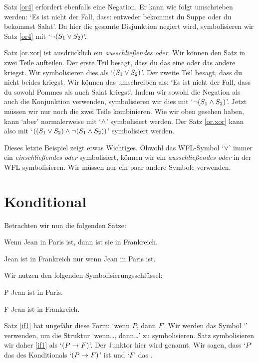 Satz \ref{or4} erfordert ebenfalls eine Negation. Er kann wie folgt umschrieben werden: `Es ist nicht der Fall, dass: entweder bekommst du Suppe oder du bekommst Salat'. Da hier die gesamte Disjunktion negiert wird, symbolisieren wir Satz \ref{or4} mit `$\neg (S_1 \vee S_2)$'.

Satz \ref{or.xor} ist ausdrücklich ein \emph{ausschlie{\ss}endes oder}. Wir können den Satz in zwei Teile aufteilen. Der erste Teil besagt, dass du das eine oder das andere kriegst. Wir symbolisieren dies als `$(S_1 \vee S_2)$'. Der zweite Teil besagt, dass du nicht beides kriegst. Wir können das umschreiben als: `Es ist nicht der Fall, dass du sowohl Pommes als auch Salat kriegst'. Indem wir sowohl die Negation als auch die Konjunktion verwenden, symbolisieren wir dies mit `$\neg (S_1 \wedge S_2)$'. Jetzt müssen wir nur noch die zwei Teile kombinieren. Wie wir oben gesehen haben, kann `aber' normalerweise mit `$\wedge$' symbolisiert werden. Der Satz \ref{or.xor} kann also mit `$((S_1 \vee S_2) \wedge \neg(S_1 \wedge S_2))$' symbolisiert werden.

Dieses letzte Beispiel zeigt etwas Wichtiges. Obwohl das WFL-Symbol `$\vee$' immer ein \emph{einschlie{\ss}endes oder} symbolisiert, können wir ein \emph{ausschlie{\ss}endes oder} in der WFL symbolisieren. Wir müssen nur ein paar andere Symbole verwenden.

\section{Konditional}
Betrachten wir nun die folgenden Sätze:
	\begin{earg}
		\item[\ex{if1}] Wenn Jean in Paris ist, dann ist sie in Frankreich.
		\item[\ex{if2}] Jean ist in Frankreich nur wenn Jean in Paris ist.
	\end{earg}
Wir nutzen den folgenden Symbolisierungsschlüssel:
	\begin{ekey}
		\item[P] Jean ist in Paris.
		\item[F] Jean ist in Frankreich.
	\end{ekey}
Satz \ref{if1} hat ungefähr diese Form: `wenn $P$, dann $F$'. Wir werden das Symbol `\eif' verwenden, um die Struktur `wenn\ldots, dann\ldots' zu symbolisieren. Satz symbolisieren wir daher \ref{if1} als `$(P\rightarrow F)$'. Der Junktor hier wird  genannt. Wir sagen, dass `$P$' das  des Konditionals `$(P \rightarrow F)$' ist und `$F$' das . 


